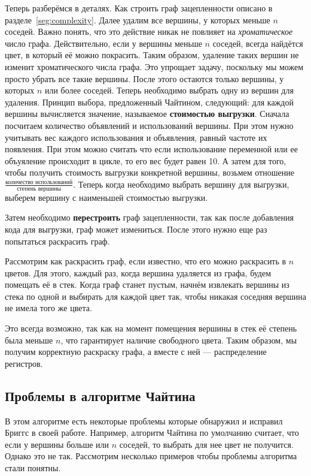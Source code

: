 Теперь разберёмся в деталях. Как строить граф зацепленности описано в разделе~\ref{seg:complexity}. Далее удалим все вершины, у
которых меньше $n$ соседей. Важно понять, что это действие никак не повлияет на \textit{хроматическое} число графа. Действительно,
если у вершины меньше $n$ соседей, всегда найдётся цвет, в который её можно покрасить. Таким образом, удаление таких вершин
не изменит хроматического числа графа. Это упрощает задачу, поскольку мы можем просто убрать все такие вершины. После этого
остаются только вершины, у которых $n$ или более соседей. Теперь необходимо выбрать одну из вершин для удаления. Принцип выбора,
предложенный Чайтином, следующий: для каждой вершины вычисляется значение, называемое \textbf{стоимостью выгрузки}. Сначала посчитаем количество
объявлений и использований вершины. При этом нужно учитывать вес каждого использования и объявления, равный частоте их появления.
При этом можно считать что если использование переменной или ее объуяление происходит в цикле, то его вес будет равен 10.
А затем для того, чтобы получить стоимость выгрузки конкретной вершины, возьмем отношение
$\frac{\textit{количество использований}}{\textit{степень вершины}}$. Теперь когда необходимо выбрать вершину для выгрузки,
выберем вершину с наименьшей стоимостью выгрузки.

Затем необходимо \textbf{перестроить} граф зацепленности, так как после добавления кода для выгрузки, граф может измениться. После этого нужно
еще раз попытаться раскрасить граф.

Рассмотрим как раскрасить граф, если известно, что его можно раскрасить в $n$ цветов. Для этого, каждый раз, когда вершина
удаляется из графа, будем помещать её в стек. Когда граф станет пустым, начнём извлекать вершины из стека по одной и выбирать
для каждой цвет так, чтобы никакая соседняя вершина не имела того же цвета. 

Это всегда возможно, так как на момент помещения вершины в стек её степень была меньше $n$, что гарантирует наличие свободного
цвета. Таким образом, мы получим корректную раскраску графа, а вместе с ней — распределение регистров.

\subsection{Проблемы в алгоритме Чайтина}

В этом алгоритме есть некоторые проблемы которые обнаружил и исправил Бриггс в своей работе.
Например, алгоритм Чайтина по умолчанию считает, что если у вершины больше или $n$ соседей,
то выбрать для нее цвет не получится.
Однако это не так. 
Рассмотрим несколько примеров чтобы проблемы алгоритма стали понятны.

